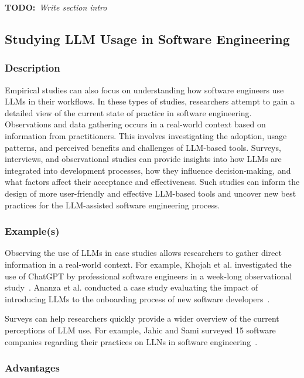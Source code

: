 \documentclass[11pt]{article}
\newcommand{\todo}[1]{{\textbf{TODO:}\ \textit{#1}}} %
\begin{document}
\todo{Write section intro}


\subsection{Studying LLM Usage in Software Engineering}

\subsubsection{Description}

Empirical studies can also focus on understanding how software engineers use LLMs in their workflows.
In these types of studies, researchers attempt to gain a detailed view of the current state of practice in software engineering.
Observations and data gathering occurs in a real-world context based on information from practitioners.
This involves investigating the adoption, usage patterns, and perceived benefits and challenges of LLM-based tools. 
Surveys, interviews, and observational studies can provide insights into how LLMs are integrated into development processes, how they influence decision-making, and what factors affect their acceptance and effectiveness. 
Such studies can inform the design of more user-friendly and effective LLM-based tools and uncover new best practices for the LLM-assisted software engineering process.

\subsubsection{Example(s)}

Observing the use of LLMs in case studies allows researchers to gather direct information in a real-world context.
For example, Khojah et al. investigated the use of ChatGPT by professional software engineers in a week-long observational study~\cite{DBLP:journals/pacmse/KhojahM0N24}.
Ananza et al. conducted a case study evaluating the impact of introducing LLMs to the onboarding process of new software developers~\cite{DBLP:conf/csee/AzanzaPIG24}.

Surveys can help researchers quickly provide a wider overview of the current perceptions of LLM use.
For example, Jahic and Sami surveyed 15 software companies regarding their practices on LLNs in software engineering~\cite{DBLP:conf/icsa/JahicS24}.

\subsubsection{Advantages}
\end{document}
